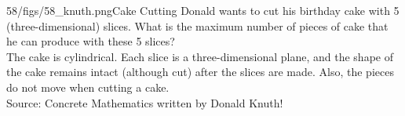\begin{problem}{58/figs/58_knuth.png}{Cake Cutting}  Donald wants to cut his birthday cake with 5 (three-dimensional) slices. What is the maximum number of pieces of cake that he can produce with these 5 slices?\\[0.2cm]
	
	The cake is cylindrical. Each slice is a three-dimensional plane, and the shape of the cake remains intact (although cut) after the slices are made. Also, the pieces do not move when cutting a cake.\\[0.2cm]
	
	Source:  Concrete Mathematics written by Donald Knuth!
\end{problem}
